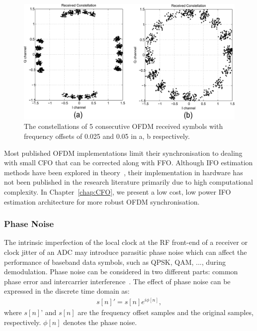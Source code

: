 \begin{figure}
	\centerline{\includegraphics [width=0.8\columnwidth] {Figures/freoff_5sym.pdf} }
	\caption{The constellations of 5 consecutive OFDM received symbols with frequency offsets of 0.025 and 0.05 in a, b respectively.}
	\label{fig:freoff_5sym}
\end{figure}

Most published OFDM implementations limit their synchronisation to dealing with small CFO that can be corrected along with FFO.
Although IFO estimation methods have been explored in theory~\cite{Shim2006,Morelli2008,You2010,Lee2013,Morelli2014}, their implementation in hardware has not been published in the research literature primarily due to high computational complexity. In Chapter~\ref{chap:CFO}, we present a low cost, low power IFO estimation architecture for more robust OFDM synchronisation.

\subsubsection{Phase Noise}

The intrinsic imperfection of the local clock at the RF front-end of a receiver or clock jitter of an ADC may introduce parasitic phase noise which can affect the performance of baseband data symbols, such as QPSK, QAM, ..., during demodulation.
Phase noise can be considered in two different parts: common phase error and intercarrier interference~\cite{Armada1998}. The effect of phase noise can be expressed in the discrete time domain as:
\begin{eqnarray}
\label{equ:}
            s[n]' = s[n] e^{i\phi[n]},
\end{eqnarray}
where $s[n]’$ and $s[n]$ are the frequency offset samples and the original samples, respectively.
$\phi[n]$ denotes the phase noise.


